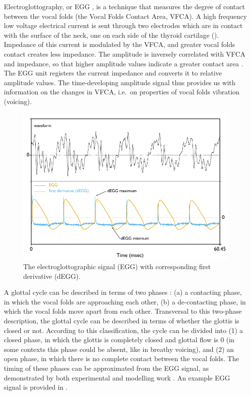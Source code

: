 \documentclass[
  11pt,
  a4paper,
]{article}
\begin{document}
Electroglottography, or EGG \citep{fabre1957}, is a technique that
measures the degree of contact between the vocal folds (the Vocal Folds
Contact Area, VFCA). A high frequency low voltage electrical current is
sent through two electrodes which are in contact with the surface of the
neck, one on each side of the thyroid cartilage ().
Impedance of this current is modulated by the VFCA, and greater vocal
folds contact creates less impedance. The amplitude is inversely
correlated with VFCA and impedance, so that higher amplitude values
indicate a greater contact area \citep{titze1990}. The EGG unit
registers the current impedance and converts it to relative amplitude
values. The time-developing amplitude signal thus provides us with
information on the changes in VFCA, i.e.~on properties of vocal folds
vibration (voicing).

\begin{figure}
  \centering
  \includegraphics{./img/degg-signal.pdf}
  \caption{The electroglottographic signal (EGG) with corresponding first derivative (dEGG).}
  \label{f:egg}
\end{figure}

A glottal cycle can be described in terms of two phases
\citep{childers1985, hampala2016}: (a) a contacting phase, in which the
vocal folds are approaching each other, (b) a de-contacting phase, in
which the vocal folds move apart from each other. Transversal to this
two-phase description, the glottal cycle can be described in terms of
whether the glottis is closed or not. According to this classification,
the cycle can be divided into (1) a closed phase, in which the glottis
is completely closed and glottal flow is 0 (in some contexts this phase
could be absent, like in breathy voicing), and (2) an open phase, in
which there is no complete contact between the vocal folds. The timing
of these phases can be approximated from the EGG signal, as demonstrated
by both experimental and modelling work \citep{hampala2016}. An example
EGG signal is provided in .
\end{document}
